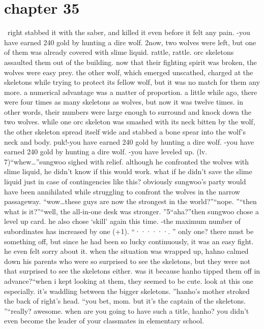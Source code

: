 \section{chapter 35}






 right stabbed it with the saber, and killed it even before it felt any pain.
-you have earned 240 gold by hunting a dire wolf.
2now, two wolves were left, but one of them was already covered with slime liquid.
rattle, rattle.
orc skeletons assaulted them out of the building.
 now that their fighting spirit was broken, the wolves were easy prey.
the other wolf, which emerged unscathed, charged at the skeletons while trying to protect its fellow wolf, but it was no match for them any more.
 a numerical advantage was a matter of proportion.
 a little while ago, there were four times as many skeletons as wolves, but now it was twelve times.
 in other words, their numbers were large enough to surround and knock down the two wolves.
while one orc skeleton was smashed with its neck bitten by the wolf, the other skeleton spread itself wide and stabbed a bone spear into the wolf’s neck and body.
puk!-you have earned 240 gold by hunting a dire wolf.
-you have earned 240 gold by hunting a dire wolf.
-you have leveled up.
 (lv.
 7)“whew…”sungwoo sighed with relief.
 although he confronted the wolves with slime liquid, he didn’t know if this would work.
 what if he didn’t save the slime liquid just in case of contingencies like this? obviously sungwoo’s party would have been annihilated while struggling to confront the wolves in the narrow passageway.
“wow…these guys are now the strongest in the world?”“nope.
”“then what is it?”“well, the all-in-one desk was stronger.
”5“aha?”then sungwoo chose a level up card.
 he also chose ‘skill’ again this time.
-the maximum number of subordinates has increased by one (+1).
“······.
”
only one? there must be something off, but since he had been so lucky continuously, it was an easy fight.
 he even felt sorry about it.
 when the situation was wrapped up, hahno calmed down his parents who were so surprised to see the skeletons, but they were not that surprised to see the skeletons either.
 was it because hanho tipped them off in advance?“when i kept looking at them, they seemed to be cute.
 look at this one especially.
 it’s waddling between the bigger skeletons.
”hanho’s mother stroked the back of right’s head.
“you bet, mom.
 but it’s the captain of the skeletons.
”“really? awesome.
 when are you going to have such a title, hanho? you didn’t even become the leader of your classmates in elementary school.
